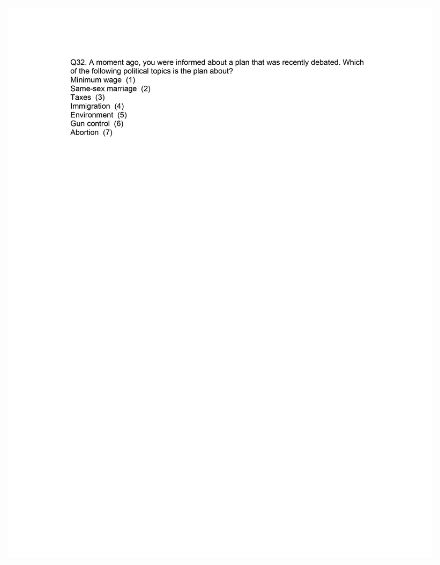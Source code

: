 \documentclass[12pt,econ]{sources/authesis}
\makeatletter
\def\maxwidth{\ifdim\Gin@nat@width>\linewidth\linewidth
\else\Gin@nat@width\fi}
\let\Oldincludegraphics\includegraphics
\renewcommand{\includegraphics}[1]{\Oldincludegraphics[width=\maxwidth]{#1}}
\makeatother
\begin{document}
\begin{figure}[hbt]
  \centering
\includegraphics{data/framing/appendix/questionnaire/questionnaire20.jpg}
\end{figure}
\end{document}
